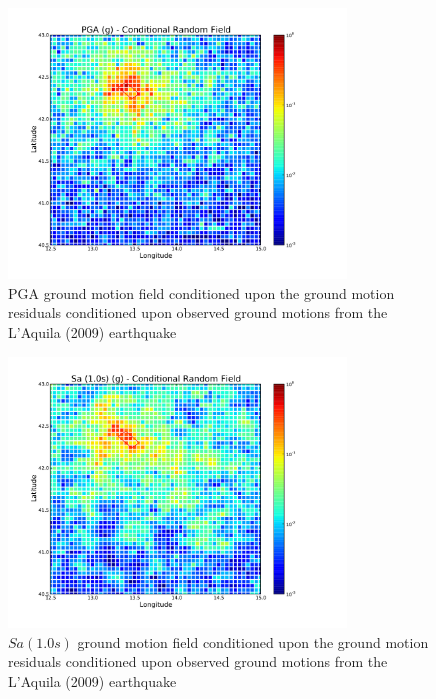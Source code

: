 \begin{figure}[htb]
	\centering
		\includegraphics[trim=10mm 10mm 10mm 10mm, clip, width=0.8\textwidth]{./figures/hazard/LAquila_Conditional_Field_PGA.pdf}
	\caption{PGA ground motion field conditioned upon the ground motion residuals conditioned upon observed ground motions from the L'Aquila (2009) earthquake}
	\label{fig:laquila_field_pga}
\end{figure}
\begin{figure}[htb]
	\centering
		\includegraphics[trim=10mm 10mm 10mm 10mm, clip, width=0.8\textwidth]{./figures/hazard/LAquila_Conditional_Field_Sa1.pdf}
	\caption{$Sa \left( {1.0 s} \right)$ ground motion field conditioned upon the ground motion residuals conditioned upon observed ground motions from the L'Aquila (2009) earthquake}
	\label{fig:laquila_field_sa1}
\end{figure}
